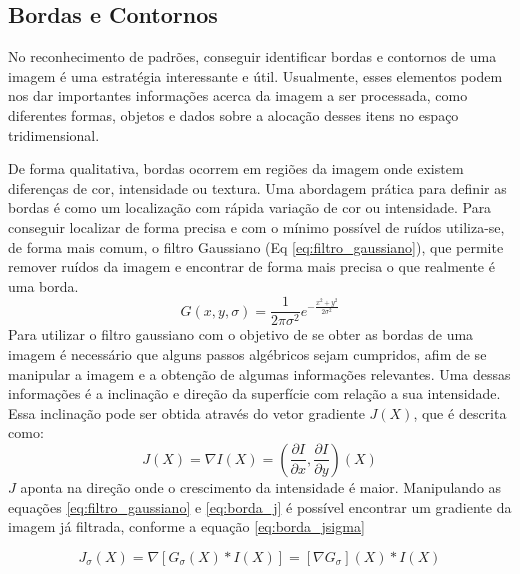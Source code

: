 \subsection{Bordas e Contornos}
No reconhecimento de padrões, conseguir identificar bordas e contornos de uma imagem é uma estratégia interessante e útil. Usualmente, esses elementos podem nos dar importantes informações acerca da imagem a ser processada, como diferentes formas, objetos e dados sobre a alocação desses itens no espaço tridimensional. \cite{szeliski2021computer}
\par
De forma qualitativa, bordas ocorrem em regiões da imagem onde existem diferenças de cor, intensidade ou textura. \cite{martin2004learning} Uma abordagem prática para definir as bordas é como um localização com rápida variação de cor ou intensidade. Para conseguir localizar de forma precisa e com o mínimo possível de ruídos utiliza-se, de forma mais comum, o filtro Gaussiano (Eq \ref{eq:filtro_gaussiano}), que permite remover ruídos da imagem e encontrar de forma mais precisa o que realmente é uma borda. \cite{szeliski2021computer}
\begin{equation}
    G(x,y,\sigma) = \frac{1}{2\pi\sigma^{2}}e^{-\frac{x^2+y^2}{2\sigma^2}}
    \label{eq:filtro_gaussiano}
\end{equation}
Para utilizar o filtro gaussiano com o objetivo de se obter as bordas de uma imagem é necessário que alguns passos algébricos sejam cumpridos, afim de se manipular a imagem e a obtenção de algumas informações relevantes. Uma dessas informações é a inclinação e direção da superfície com relação a sua intensidade. Essa inclinação pode ser obtida através do vetor gradiente $J(X)$, que é descrita como:
\begin{equation}
    J(X) = \nabla I(X) = (\frac{\partial I}{\partial x},\frac{\partial I}{\partial y})(X)
    \label{eq:borda_j}
\end{equation}
$J$ aponta na direção onde o crescimento da intensidade é maior. Manipulando as equações \ref{eq:filtro_gaussiano} e \ref{eq:borda_j} é possível encontrar um gradiente da imagem já filtrada, conforme a equação \ref{eq:borda_jsigma}

\begin{equation}
    J_{\sigma}(X) = \nabla [ G_{\sigma}(X) * I(X) ] = [\nabla G_{\sigma}](X) * I(X) 
    \label{eq:borda_jsigma}
\end{equation}

